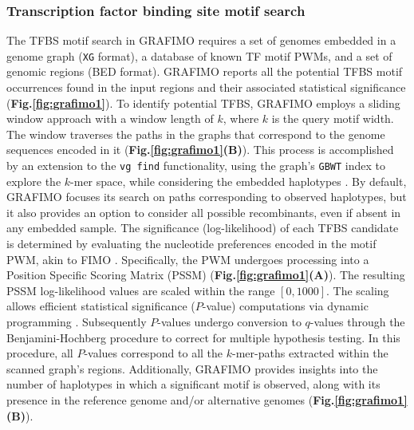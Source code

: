 \documentclass[a4paper, titlepage, openright]{book}
\newcommand{\grafimo}{GRAFIMO\xspace}
\begin{document}
\subsubsection{Transcription factor binding site motif search}
The TFBS motif search in \grafimo requires a set of genomes embedded in a genome graph (\texttt{XG} format), a database of known TF motif PWMs, and a set of genomic regions (BED format). \grafimo reports all the potential TFBS motif occurrences found in the input regions and their associated statistical significance (\textbf{Fig.\ref{fig:grafimo1}}). To identify potential TFBS, \grafimo employs a sliding window approach with a window length of $k$, where $k$ is the query motif width. The window traverses the paths in the graphs that correspond to the genome sequences encoded in it (\textbf{Fig.\ref{fig:grafimo1}(B)}). This process is accomplished by an extension to the \texttt{vg find} functionality, using the graph's \texttt{GBWT} index to explore the $k$-mer space, while considering the embedded haplotypes \citep{siren2020haplotype}. By default, \grafimo focuses its search on paths corresponding to observed haplotypes, but it also provides an option to consider all possible recombinants, even if absent in any embedded sample. The significance (log-likelihood) of each TFBS candidate is determined by evaluating the nucleotide preferences encoded in the motif PWM, akin to FIMO \citep{grant2011fimo}. Specifically, the PWM undergoes processing into a Position Specific Scoring Matrix (PSSM) (\textbf{Fig.\ref{fig:grafimo1}(A)}). The resulting PSSM log-likelihood values are scaled within the range $[0, 1000]$. The scaling allows efficient statistical significance ($P$-value) computations via dynamic programming \citep{grant2011fimo}. Subsequently $P$-values undergo conversion to $q$-values through the Benjamini-Hochberg procedure to correct for multiple hypothesis testing. In this procedure, all $P$-values correspond to all the $k$-mer-paths extracted within the scanned graph's regions. Additionally, \grafimo provides insights into the number of haplotypes in which a significant motif is observed, along with its presence in the reference genome and/or alternative genomes (\textbf{Fig.\ref{fig:grafimo1}(B)}). 
\end{document}
